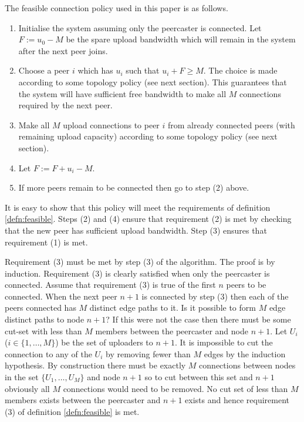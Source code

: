 \begin{definition}\label{defn:thisfeasible}
The feasible connection policy used in this paper is as follows.
\begin{enumerate}
\item Initialise the system assuming only the peercaster is connected.  Let
$F:= u_0 - M$ be the spare upload bandwidth which will remain in the system
after the next peer joins.
\item Choose a peer $i$ which has $u_i$ 
such that $u_i + F \geq M$.  The choice is made according to some topology
policy (see next section).   This  guarantees that the system will have sufficient 
free bandwidth to make all $M$ connections required by the next peer.
\item Make all $M$ upload connections to peer $i$ from already connected peers (with
remaining upload capacity) according to some topology
policy (see next section).
\item Let $F:=F + u_i -M$.
\item If more peers remain to be connected then go to step (2) above.
\end{enumerate}
\end{definition}

It is easy to show that this policy will meet the requirements of
definition \ref{defn:feasible}.  Steps (2) and (4) ensure that requirement (2)
is met by checking that the new peer has sufficient upload bandwidth.  
Step (3) ensures that requirement (1) is met.  


Requirement (3) must be met by step (3) of the algorithm.  The proof is
by induction.  Requirement (3) is clearly satisfied when only the peercaster
is connected.
Assume that requirement (3)
is true of the first $n$ peers to be connected.  When the next peer $n+1$
is connected by step (3) then each of the peers connected has $M$ distinct edge
paths to it.  Is it possible to form $M$ edge distinct paths
to node $n+1$?  If this were not the case then there must be some cut-set with less
than $M$ members between the peercaster and node $n+1$.  Let $U_i$ ($i \in \{1,\ldots,M\}$)
be the set of uploaders to $n+1$.  It is impossible to cut the connection to any of
the $U_i$ by removing fewer than $M$ edges by the induction hypothesis.  By construction
there must be 
exactly $M$
connections between nodes in the set $\{U_1, \ldots, U_M\}$ 
and node $n+1$ so to cut between this set
and $n+1$ obviously all $M$ connections
would need to be removed.  No cut set of less than $M$ members exists between the
peercaster and $n+1$ exists and hence requirement (3) of definition \ref{defn:feasible}
is met.

